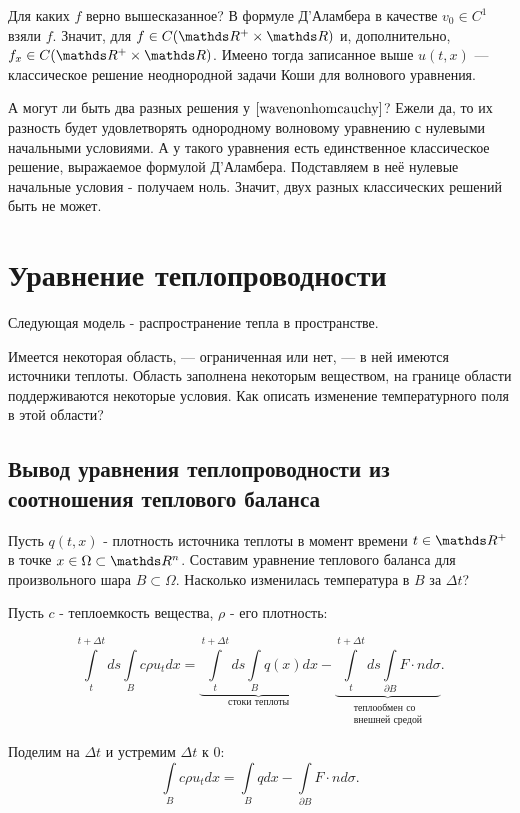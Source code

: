 Для каких $f$ верно вышесказанное? В формуле Д'Аламбера в качестве $v_0 \in C^1$ взяли $f$. Значит, для $f \in C(\real^+ \times \real)$ и, дополнительно, $f_x \in C(\real^+ \times \real)$. Имеено тогда записанное выше $u(t,x)$ --- классическое решение неоднородной задачи Коши для волнового уравнения.

А могут ли быть два разных решения у $\eqref{wavenonhomcauchy}$? Ежели да, то их разность будет удовлетворять однородному волновому уравнению с нулевыми начальными условиями. А у такого уравнения есть единственное классическое решение, выражаемое формулой Д'Аламбера. Подставляем в неё нулевые начальные условия - получаем ноль. Значит, двух разных классических решений быть не может.

\section{Уравнение теплопроводности}
Следующая модель - распространение тепла в пространстве.

Имеется некоторая область, --- ограниченная или нет, --- в ней имеются источники теплоты. Область заполнена некоторым веществом, на границе области поддерживаются некоторые условия. Как описать изменение температурного поля в этой области?

\subsection{Вывод уравнения теплопроводности из соотношения теплового баланса}

Пусть $q(t,x)$ - плотность источника теплоты в момент времени $t \in \real^+$ в точке $x \in \Omega \subset \real^n$. Составим уравнение теплового баланса для произвольного шара $B \subset \Omega$. Насколько изменилась температура в $B$ за $\Delta t$?

Пусть $c$ - теплоемкость вещества, $\rho$ - его плотность:

$$ \int \limits_t^{t +\Delta t} ds \int \limits_B  c \rho u_t dx = \underbrace {\int \limits_t^{t + \Delta t} ds \int \limits_B q(x) dx}_{\text{стоки теплоты}} - \underbrace {\int \limits_t^{t + \Delta t} ds \int \limits_{\partial B} F \cdot n d \sigma}_{\substack{\text{теплообмен со} \\ \text{внешней средой}}}.$$

Поделим на $\Delta t$ и устремим $\Delta t$ к $0$:
$$ \int \limits_B c \rho u_t dx = \int \limits_B q dx - \int \limits_{\partial B} F \cdot n d \sigma. $$

